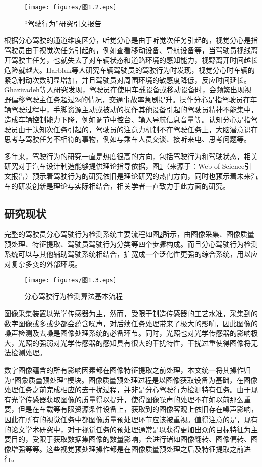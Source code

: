 \begin{figure}[!h]
	\centering
	\texttt{[image: figures/图1.2.eps]}
	\caption{“驾驶行为”研究引文报告}\label{图1.2}
\end{figure}

根据分心驾驶的通道维度区分，听觉分心是由于听觉次任务引起的，视觉分心是指驾驶员由于视觉次任务引起的，例如查看移动设备、导航设备等，当驾驶员视线离开驾驶主任务，也就失去了对车辆状态和道路环境的感知能力，视野离开时间越长危险就越大。Harbluk等人\cite{7}研究车辆驾驶员的驾驶行为时发现，视觉分心时车辆的紧急制动次数明显增加，并且驾驶员对周围环境的敏感度降低，反应时间延长。Ghazizadeh等人\cite{9}研究发现，驾驶员在使用车载设备或移动设备时，会频繁出现视野偏移驾驶主任务超过2s的情况，交通事故率急剧提升。操作分心是指驾驶员在车辆驾驶过程中，手脚资源主动或被动的操作其他设备引起的驾驶员精神不能集中，造成车辆控制能力下降，例如调节中控台、输入导航信息音量等。认知分心是指驾驶员由于认知次任务引起的，驾驶员的注意力机制不在驾驶任务上，大脑潜意识在思考与驾驶任务不相符的事物，例如与乘车人员交谈、接听来电、思考问题等\cite{8}。

多年来，驾驶行为的研究一直是热度很高的方向，包括驾驶行为和驾驶状态，相关研究对于汽车设计制造能够提供理论指导依据，图\ref{图1.2}（来源于：Web of Science引文报告）预示着驾驶行为的研究依旧是理论研究的热门方向，同时也预示着未来汽车的研发创新是理论与实际相结合，相关学者一直致力于此方面的研究。

\subsection{研究现状}

完整的驾驶员分心驾驶行为检测系统主要流程如图\ref{图1.3}所示，由图像采集、图像质量预处理、特征提取、驾驶员驾驶行为分类等四个步骤构成。而且分心驾驶行为检测系统可以与其他辅助驾驶系统相结合，扩宽成一个泛化性更强的综合系统，用以应对复杂多变的外部环境。

\begin{figure}[!ht]
	\centering
	\texttt{[image: figures/图1.3.eps]}
	\caption{分心驾驶行为检测算法基本流程}\label{图1.3}
\end{figure}

图像采集装置以光学传感器为主，然而，受限于制造传感器的工艺水准，采集到的数字图像或多或少都会蕴含噪声，对后续任务处理带来了极大的影响，因此图像的噪声检测及去噪是图像处理系统的必备环节。同时，光照也对光学传感器的影响极大，光照的强弱对光学传感器的感知具有很大的干扰特性，干扰过重使得图像将无法检测处理。

数字图像蕴含的所有影响因素都在图像特征提取之前处理，本文统一将其操作归为“图象质量预处理”模块。图像质量预处理过程是以图像获取设备为基础，在图像处理任务之前完成相应的去干扰过程，并非是分心驾驶行为检测特有任务。由于现有光学传感器获取图像的质量得以提升，使得图像噪声的处理不在如以前那么重要，但是在车载等有限资源条件设备上，获取到的图像客观上依旧存在噪声影响，因此在所有的视觉任务中都图像质量预处理环节应该被重视。值得注意的是，现有的论文学术研究中，对于视觉任务的预处理通常是以获得更加出众的目标特征为主要目的，受限于获取数据集图像的数量影响，会进行诸如图像翻转、图像偏转、图像增强等等\cite{10}。这些视觉预处理操作都是在图像质量预处理之后及特征提取之前进行。

